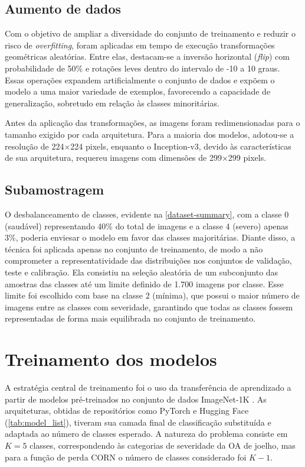 \subsection{Aumento de dados}

Com o objetivo de ampliar a diversidade do conjunto de treinamento e reduzir o risco de \textit{overfitting}, foram aplicadas em tempo de execução transformações geométricas aleatórias. Entre elas, destacam-se a inversão horizontal (\textit{flip}) com probabilidade de 50\% e rotações leves dentro do intervalo de -10 a 10 graus. Essas operações expandem artificialmente o conjunto de dados e expõem o modelo a uma maior variedade de exemplos, favorecendo a capacidade de generalização, sobretudo em relação às classes minoritárias.  

Antes da aplicação das transformações, as imagens foram redimensionadas para o tamanho exigido por cada arquitetura. Para a maioria dos modelos, adotou-se a resolução de 224×224 pixels, enquanto o Inception-v3, devido às características de sua arquitetura, requereu imagens com dimensões de 299×299 pixels.

\subsection{Subamostragem}

O desbalanceamento de classes, evidente na \autoref{dataset-summary}, com a classe 0 (saudável) representando 40\% do total de imagens e a classe 4 (severo) apenas 3\%, poderia enviesar o modelo em favor das classes majoritárias. Diante disso, a técnica foi aplicada apenas no conjunto de treinamento, de modo a não comprometer a representatividade das distribuições nos conjuntos de validação, teste e calibração. Ela consistiu na seleção aleatória de um subconjunto das amostras das classes até um limite definido de 1.700 imagens por classe. Esse limite foi escolhido com base na classe 2 (mínima), que possui o maior número de imagens entre as classes com severidade, garantindo que todas as classes fossem representadas de forma mais equilibrada no conjunto de treinamento.

\section{Treinamento dos modelos}

A estratégia central de treinamento foi o uso da transferência de aprendizado a partir de modelos pré-treinados no conjunto de dados ImageNet-1K \cite{Russakovsky2015}. As arquiteturas, obtidas de repositórios como PyTorch e Hugging Face (\autoref{tab:model_list}), tiveram sua camada final de classificação substituída e adaptada ao número de classes esperado. A natureza do problema consiste em $K=5$ classes, correspondendo às categorias de severidade da OA de joelho, mas para a função de perda CORN o número de classes considerado foi $K-1$.

